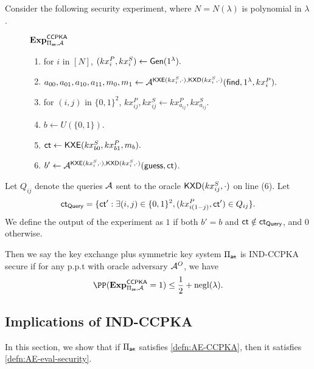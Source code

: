 \begin{definition}
\label{defn:AE-CCPKA}
Consider the following security experiment, where $N = N(\lambda)$ is polynomial in $\lambda$.
\begin{figure}[h!]
\begin{framed}
$\mathbf{Exp}^{\mathsf{CCPKA}}_{\Pi_{\mathsf{ae}}, \mathcal{A}}$
\begin{enumerate}
    \item for $i$ in $[N]$, $(kx_{i}^P, kx_{i}^S) \leftarrow \mathsf{Gen}(1^{\lambda}).$
    \item $a_{00}, a_{01}, a_{10}, a_{11}, m_0, m_1 \leftarrow \mathcal{A}^{\mathsf{KXE}(kx_{i}^S, \cdot), \mathsf{KXD}(kx_{i}^S, \cdot)}(\mathsf{find}, 1^{\lambda}, kx_{i}^P).$
    \item for $(i, j)$ in $\{0, 1\}^2$, $kx^{P}_{ij}, kx^S_{ij} \leftarrow kx^P_{a_{ij}}, kx^S_{a_{ij}}$. 
    \item $b \leftarrow U(\{0, 1\})$.
    \item $\mathsf{ct} \leftarrow \mathsf{KXE}(kx_{b0}^S, kx_{b1}^P, m_b).$
    \item $b' \leftarrow \mathcal{A}^{\mathsf{KXE}(kx_{i}^S, \cdot), \mathsf{KXD}(kx_{i}^S, \cdot)}(\mathsf{guess}, \mathsf{ct})$.
\end{enumerate}
\end{framed}
\end{figure}

Let $Q_{ij}$ denote the queries $\mathcal{A}$ sent to the oracle $\mathsf{KXD}(kx_{ij}^S, \cdot)$ on line (6). Let
$$\mathsf{ct}_{\mathsf{Query}} = \{\mathsf{ct}': \exists (i,j) \in \{0, 1\}^2, (kx_{i(1 - j)}^P, \mathsf{ct}') \in Q_{ij}\}.$$
We define the output of the experiment as $1$ if both $b' = b$ and $\mathsf{ct} \notin \mathsf{ct}_{\mathsf{Query}}$, and $0$ otherwise. 

Then we say the key exchange plus symmetric key system $\Pi_{\mathsf{ae}}$ is IND-CCPKA secure if for any p.p.t with oracle adversary $\mathcal{A}^O$, we have
$$\PP(\mathbf{Exp}^{\mathsf{CCPKA}}_{\Pi_{\ae}, \cA} = 1) \leq \frac{1}{2} + \negl(\lambda).$$
\end{definition}
\subsection{Implications of IND-CCPKA}
In this section, we show that if $\Pi_{\mathsf{ae}}$ satisfies \cref{defn:AE-CCPKA}, then it satisfies \cref{defn:AE-eval-security}.

